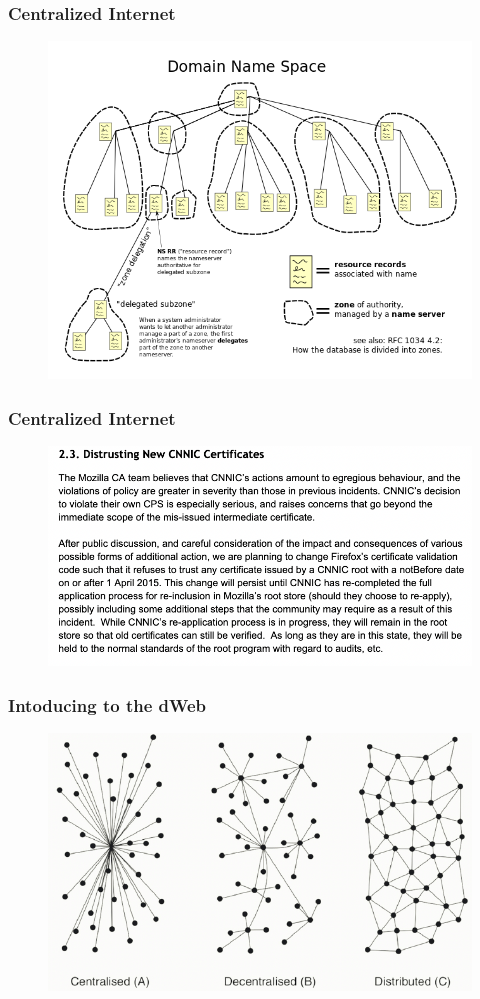 \begin{frame}
\frametitle{ Centralized Internet }
  \begin{figure}[h]
  \centering
  \includegraphics[height=0.5\linewidth]{dns.png}
  \end{figure}
\end{frame}


\begin{frame}
\frametitle{ Centralized Internet }
  \begin{figure}[h]
  \centering
  \includegraphics[height=0.4\linewidth]{CNNIC.png}
  \end{figure}
\end{frame}


\begin{frame}
\frametitle{ Intoducing to the dWeb }
  \begin{figure}[h]
  \centering
  \includegraphics[width=0.7\linewidth]{lopologic.png}\cite{mozilla2018}
  \end{figure}
\end{frame}

